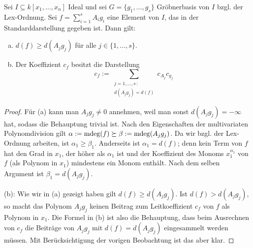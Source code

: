 \documentclass[11pt]{article}
\numberwithin{equation}{section}
\begin{document}
\begin{lemma} \label{lex:ord:lemma} 
	Sei $I \subseteq k[x_1,\ldots,x_n]$ Ideal und sei $G = \{g_1,\ldots,g_s\}$ Gröbnerbasis von $I$ bzgl. der Lex-Ordnung. Sei $f = \sum_{i=1}^s A_i g_i$ eine Element von $I$, das in der Standarddarstellung gegeben ist. Dann gilt: 
	\begin{enumerate}[(a)]
		\item $d(f) \ge d(A_j g_j)$ für alle $j \in \{1,\ldots,s\}$. 
		\item Der Koeffizient $c_f$ besitzt die Darstellung 
		\[c_f := \sum_{\substack{j=1,\ldots,s  \, : \\  d(A_j g_j ) = d(f)}} c_{A_j} c_{g_j}
		\]
	\end{enumerate} 
\end{lemma} 
\begin{proof} 
	Für (a) kann man $A_j g_j \ne 0$ annehmen, weil man sonst $d(A_j g_j) = -\infty$ hat, sodass die Behauptung trivial ist. Nach den Eigenschaften der multivariaten Polynomdivision gilt $\alpha: = \operatorname{mdeg}(f) \succeq  \beta := \operatorname{mdeg}(A_j g_j)$. Da wir bzgl. der Lex-Ordnung arbeiten, ist $\alpha_1 \ge \beta_1$. Anderseits ist $\alpha_1 = d(f)$; denn kein Term von $f$ hat den Grad in $x_1$, der höher als $\alpha_1$ ist und der Koeffizient des Monoms $x_1^{\alpha_1}$ von $f$ (als Polynom in $x_1$) mindestens ein Monom enthält. Nach dem selben Argument ist $\beta_1 = d(A_j g_j )$. 
	
	(b): Wie wir in (a) gezeigt haben gilt $d(f) \ge d(A_j g_j )$. Ist $d(f) > d(A_j g_j)$, so macht das Polynom $A_j g_j$ keinen Beitrag zum Leitkoeffizient $c_f$ von $f$ als Polynom in $x_1$. Die Formel in (b) ist also die Behauptung, dass beim Ausrechnen von $c_f$ die Beiträge von $A_j g_j$ mit $d(f) = d(A_j g_j)$ eingesammelt werden müssen. Mit Berücksichtigung der vorigen Beobachtung ist das aber klar. 
\end{proof} 
\end{document}
